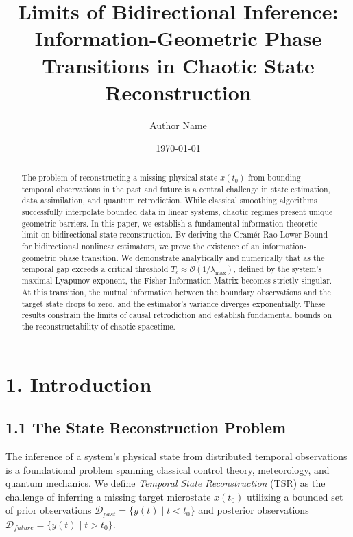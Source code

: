 \documentclass[aps,prl,reprint,superscriptaddress,nofootinbib]{revtex4-2}
\begin{document}
\title{Limits of Bidirectional Inference: Information-Geometric Phase Transitions in Chaotic State Reconstruction}

\author{Author Name}

\date{\today}

\begin{abstract}
The problem of reconstructing a missing physical state $x(t_0)$ from bounding temporal observations in the past and future is a central challenge in state estimation, data assimilation, and quantum retrodiction. While classical smoothing algorithms successfully interpolate bounded data in linear systems, chaotic regimes present unique geometric barriers. In this paper, we establish a fundamental information-theoretic limit on bidirectional state reconstruction. By deriving the Cram\'{e}r-Rao Lower Bound for bidirectional nonlinear estimators, we prove the existence of an information-geometric phase transition. We demonstrate analytically and numerically that as the temporal gap exceeds a critical threshold $T_c \approx \mathcal{O}(1/\lambda_{\max})$, defined by the system's maximal Lyapunov exponent, the Fisher Information Matrix becomes strictly singular. At this transition, the mutual information between the boundary observations and the target state drops to zero, and the estimator's variance diverges exponentially. These results constrain the limits of causal retrodiction and establish fundamental bounds on the reconstructability of chaotic spacetime.
\end{abstract}

\maketitle

\section{1. Introduction}

\subsection{1.1 The State Reconstruction Problem}
The inference of a system's physical state from distributed temporal observations is a foundational problem spanning classical control theory, meteorology, and quantum mechanics. We define \textit{Temporal State Reconstruction} (TSR) as the challenge of inferring a missing target microstate $x(t_0)$ utilizing a bounded set of prior observations $\mathcal{D}_{past} = \{y(t) \mid t < t_0\}$ and posterior observations $\mathcal{D}_{future} = \{y(t) \mid t > t_0\}$. 
\end{document}
